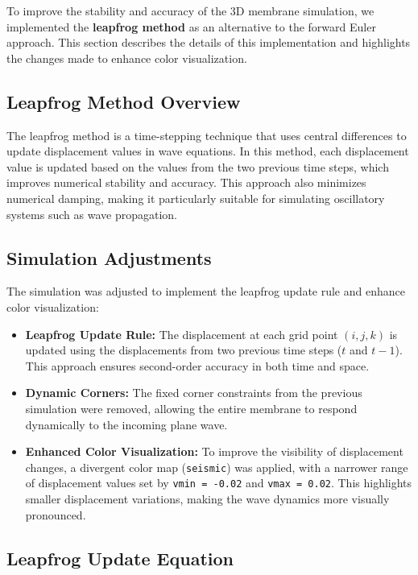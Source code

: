 \documentclass{article}
\begin{document}
To improve the stability and accuracy of the 3D membrane simulation, we implemented the \textbf{leapfrog method} as an alternative to the forward Euler approach. This section describes the details of this implementation and highlights the changes made to enhance color visualization.

\subsection{Leapfrog Method Overview}

The leapfrog method is a time-stepping technique that uses central differences to update displacement values in wave equations. In this method, each displacement value is updated based on the values from the two previous time steps, which improves numerical stability and accuracy. This approach also minimizes numerical damping, making it particularly suitable for simulating oscillatory systems such as wave propagation.

\subsection{Simulation Adjustments}

The simulation was adjusted to implement the leapfrog update rule and enhance color visualization:

\begin{itemize}
    \item \textbf{Leapfrog Update Rule:} The displacement at each grid point $(i, j, k)$ is updated using the displacements from two previous time steps ($t$ and $t-1$). This approach ensures second-order accuracy in both time and space.
    \item \textbf{Dynamic Corners:} The fixed corner constraints from the previous simulation were removed, allowing the entire membrane to respond dynamically to the incoming plane wave.
    \item \textbf{Enhanced Color Visualization:} To improve the visibility of displacement changes, a divergent color map (\texttt{seismic}) was applied, with a narrower range of displacement values set by \texttt{vmin = -0.02} and \texttt{vmax = 0.02}. This highlights smaller displacement variations, making the wave dynamics more visually pronounced.
\end{itemize}

\subsection{Leapfrog Update Equation}
\end{document}
